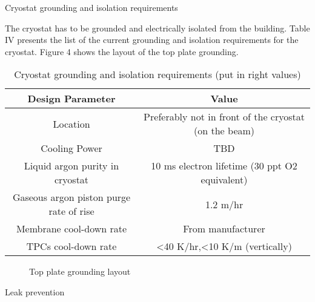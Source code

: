 Cryostat grounding and isolation requirements

The cryostat has to be grounded and electrically isolated from the building. Table IV presents the list of the current grounding and isolation requirements for the cryostat. Figure 4 shows the layout of the top plate grounding.

\begin{table}[htpb]
\caption{Cryostat grounding and isolation requirements (put in right values)}
\label{tbl:cryostat-grounding-reqs}
\centering
\begin{tabular}[htbp]{cc}
\hline
 Design Parameter & Value \\ \hline
 Location & Preferably not in front of the cryostat (on the beam) \\ \hline
 Cooling Power & TBD  \\ \hline
 Liquid argon purity in cryostat & 10 ms electron lifetime (30 ppt O2 equivalent) \\ 
 Gaseous argon piston purge rate of rise & 1.2 m/hr \\ \hline
 Membrane cool-down rate & From manufacturer \\  \hline
 TPCs cool-down rate & <40 K/hr,<10 K/m (vertically)
 \\ \hline
\end{tabular}
\end{table}

\begin{figure}
\begin{center}
\caption[Top plate grounding layout]{\label{fig:top-plate-gnd}Top plate grounding layout}
\end{center}
\end{figure}

Leak prevention

